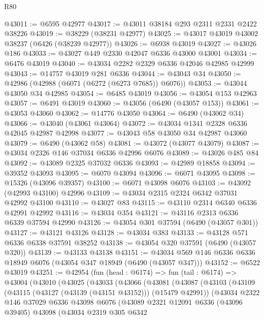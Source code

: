 \begin{lexlean}{R80}
\begin{coremodule}
@43011 := @6595 @42977
@43017 := @43011 @38184 @293 @2311 @2331 @2422 @38226
@43019 := @38229 (@38231 @42977)
@43025 := @43017 @43019 @43002 @38237 (@6426 (@38239 @42977))
@43026 := @6938 @43019
@43027 := @43026 @186
@43033 := @43027 @449 @2330 @42047 @6336 @43000 @43001
@43034 := @6476 @43019
@43040 := @43034 @2282 @2329 @6336 @42046 @42985 @42999
@43043 := @14757 @43019 @281 @6336
@43044 := @43043 @34
@43050 := @42986 (@42988 (@6071 (@6272 (@6273 @7685)) @6076))
@43053 := @43044 @43050 @34 @42985
@43054 := @6485 @43019
@43056 := @43054 @153 @42963
@43057 := @6491 @43019
@43060 := @43056 (@6490 (@43057 @153))
@43061 := @43053 @43060
@43062 := @14776 @43050
@43064 := @6490 (@43062 @34)
@43066 := @43040 (@43061 @43064)
@43072 := @43034 @1341 @2328 @6336 @42045 @42987 @42998
@43077 := @43043 @58 @43050 @34 @42987 @43060
@43079 := @6490 (@43062 @58)
@43081 := @43072 (@43077 @43079)
@43087 := @43034 @2326 @146 @37034 @6336 @42996 @6076
@43089 := @43026 @485 @84
@43092 := @43089 @2325 @37032 @6336
@43093 := @42989 @18858
@43094 := @39352 @43093
@43095 := @6070 @43094
@43096 := @6071 @43095
@43098 := @15326 (@43096 @39357)
@43100 := @6071 @43098 @6076
@43103 := @43092 (@42993 @43100) @42996
@43109 := @43034 @2315 @2324 @6342 @37031 @42992 @43100
@43110 := @43027 @83
@43115 := @43110 @2314 @6340 @6336 @42991 @42992
@43116 := @43034 @354
@43121 := @43116 @2313 @6336 @6339 @37594 @42990
@43126 := @43054 @301 @37594 (@6490 (@43057 @301))
@43127 := @43121 @43126
@43128 := @43034 @383
@43133 := @43128 @571 @6336 @6338 @37591 @38252
@43138 := @43054 @320 @37591 (@6490 (@43057 @320))
@43139 := @43133 @43138
@43151 := @43034 @569 @146 @6336 @6336 @18949 @6076 (@43054 @347 @18949 (@6490 (@43057 @347)))
@43152 := @6522 @43019
@43251 := @42954
    (fun (head : @6174) =>
    fun (tail : @6174) =>
    @43004
      (@43010
        (@43025
          (@43033
            (@43066
              (@43081
                (@43087
                  (@43103
                    (@43109
                      (@43115 (@43127 (@43139 (@43151 @43152))) (@15479 @42991))
                      (@43034
                        @2322
                        @146
                        @37029
                        @6336
                        @43098
                        @6076
                        (@43089
                          @2321
                          @12091
                          @6336
                          (@43096 @39405)
                          @43098
                          (@43034
                            @2319
                            @305
                            @6342

\end{coremodule}
\end{lexlean}
